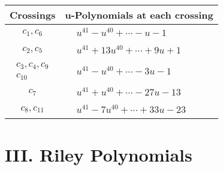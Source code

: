 \documentclass[1p]{elsarticle_modified}
\theoremstyle{definition}
\begin{document}
\begin{tabular}{m{50pt}|m{274pt}}
Crossings & \hspace{64pt}u-Polynomials at each crossing \\
\hline $$\begin{aligned}c_{1},c_{6}\end{aligned}$$&$\begin{aligned}
&u^{41}- u^{40}+\cdots- u-1
\end{aligned}$\\
\hline $$\begin{aligned}c_{2},c_{5}\end{aligned}$$&$\begin{aligned}
&u^{41}+13 u^{40}+\cdots+9 u+1
\end{aligned}$\\
\hline $$\begin{aligned}c_{3},c_{4},c_{9}\\c_{10}\end{aligned}$$&$\begin{aligned}
&u^{41}- u^{40}+\cdots-3 u-1
\end{aligned}$\\
\hline $$\begin{aligned}c_{7}\end{aligned}$$&$\begin{aligned}
&u^{41}+u^{40}+\cdots-27 u-13
\end{aligned}$\\
\hline $$\begin{aligned}c_{8},c_{11}\end{aligned}$$&$\begin{aligned}
&u^{41}-7 u^{40}+\cdots+33 u-23
\end{aligned}$\\
\hline
\end{tabular}\newpage\renewcommand{\arraystretch}{1}
\centering \section*{ III. Riley Polynomials}
\end{document}
